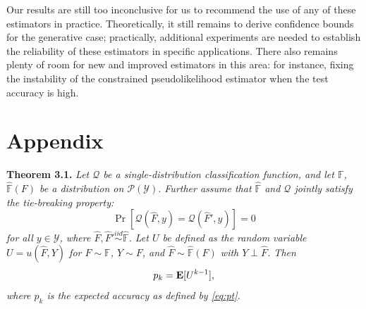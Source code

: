 \documentclass[12pt]{article}
\begin{document}
Our results are still too inconclusive for us to recommend the use of any of these estimators in practice.
Theoretically, it still remains to derive confidence bounds for the generative case;
practically, additional experiments are needed to establish the reliability of these estimators
in specific applications.  There also remains plenty of room for new and improved estimators in this area:
for instance, fixing the instability of the constrained pseudolikelihood estimator when the test accuracy is high.





\section*{Appendix}

\noindent\textbf{Theorem 3.1.} \emph{
Let $\mathcal{Q}$ be a single-distribution classification function, and let $\mathbb{F}$, $\hat{\mathbb{F}}(F)$ be a distribution on $\mathcal{P}(\mathcal{Y}).$
Further assume that
$\hat{\mathbb{F}}$ and $\mathcal{Q}$ jointly satisfy the
\emph{tie-breaking} property:
\begin{equation}\label{eq:tie}
\Pr[\mathcal{Q}(\hat{F}, y) = \mathcal{Q}(\hat{F}', y)] = 0
\end{equation}
for all $y \in \mathcal{Y}$, where $\hat{F}, \hat{F}' \stackrel{iid}{\sim} \hat{\mathbb{F}}$.
Let $U$ be defined as the random variable
$U = u(\hat{F}, Y)$
for $F \sim \mathbb{F}$, $Y \sim F$, and $\hat{F} \sim \hat{\mathbb{F}}(F)$ with $Y \perp \hat{F}$.
Then \[p_k = \textbf{E}[U^{k-1}],\]
where $p_k$ is the expected accuracy as defined by \eqref{eq:pt}.
}
\end{document}
